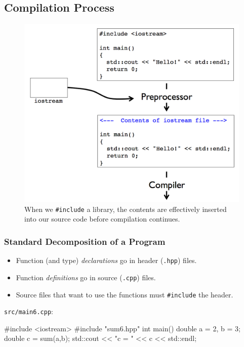 \documentclass[12pt,letterpaper,twoside]{article}
\begin{document}
\subsection{Compilation Process}
\begin{figure}[h]
\centering
\includegraphics[scale=0.5]{fig/compilation.png}
\caption{\footnotesize When we \texttt{\#include} a library, the contents are effectively inserted
into our source code before compilation continues.}
\end{figure}

\subsubsection{Standard Decomposition of a Program}
\begin{itemize}
\item
  Function (and type) \emph{declarations} go in header (\texttt{.hpp})
  files.
\item
  Function \emph{definitions} go in source (\texttt{.cpp}) files.
\item
  Source files that want to use the functions must \texttt{\#include}
  the header.
\end{itemize}

\texttt{src/main6.cpp}:

\begin{cpp}
#include <iostream> #include "sum6.hpp"
 int main() {
  double a = 2, b = 3;   double c = sum(a,b);
  std::cout << "c = " << c << std::endl;
} \end{cpp}
\end{document}
